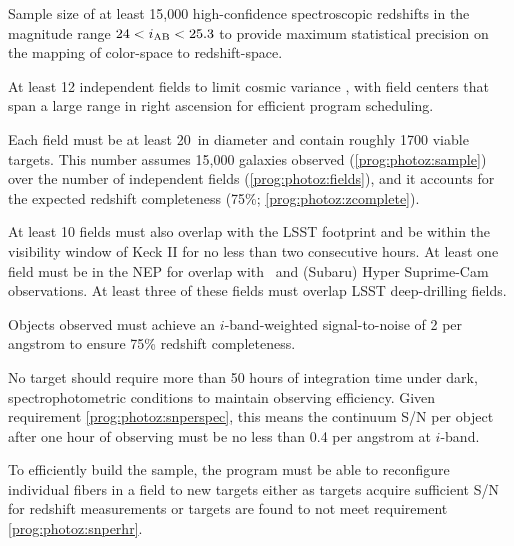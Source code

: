 \documentclass[11pt,a4paper,twoside,onecolumn,openany,final,oldfontcommands]{memoir}
\begin{document}
\begin{programrequirement}
\reqitem Sample size of at least 15,000 high-confidence spectroscopic redshifts in the magnitude range $24 < i_{\rm AB} < 25.3$ to provide maximum statistical precision on the mapping of color-space to redshift-space. \label{prog:photoz:sample}


\reqitem At least 12 independent fields to limit cosmic variance \citep[see][]{newman15}, with field centers that span a large range in right ascension for efficient program scheduling. \label{prog:photoz:fields}

\reqitem Each field must be at least 20\arcmin\ in diameter and contain roughly 1700 viable targets.  This number assumes 15,000 galaxies observed (\ref{prog:photoz:sample}) over the number of independent fields (\ref{prog:photoz:fields}), and it accounts for the expected redshift completeness (75\%; \ref{prog:photoz:zcomplete}).


\reqitem At least 10 fields must also overlap with the LSST footprint and be within the visibility window of Keck II for no less than two consecutive hours.
\reqitem At least one field must be in the NEP for overlap with \euclid\ and (Subaru) Hyper Suprime-Cam observations.
\reqitem At least three of these fields must overlap LSST deep-drilling fields.

\reqitem Objects observed must achieve an $i$-band-weighted signal-to-noise of 2 per angstrom to ensure 75\% redshift completeness. \label{prog:photoz:snperspec}


\reqitem No target should require more than 50 hours of integration time under dark, spectrophotometric conditions to maintain observing efficiency.  Given requirement \ref{prog:photoz:snperspec}, this means the continuum S/N per object after one hour of observing must be no less than 0.4 per angstrom at $i$-band.  \label{prog:photoz:snperhr}

\reqitem To efficiently build the sample, the program must be able to reconfigure individual fibers in a field to new targets either as targets acquire sufficient S/N for redshift measurements or targets are found to not meet requirement \ref{prog:photoz:snperhr}.
\end{programrequirement}
\end{document}
